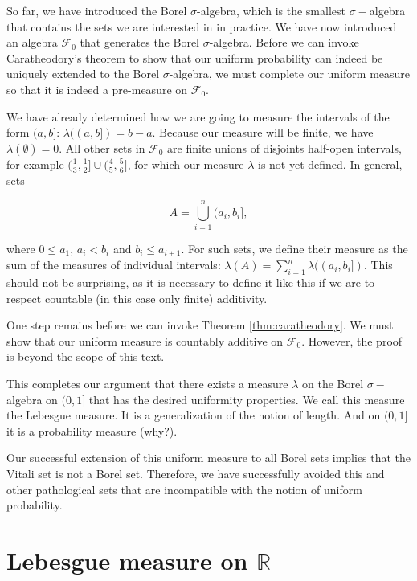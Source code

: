 \documentclass{book}
\theoremstyle{plain}%
\theoremstyle{definition}
\begin{document}
So far, we have introduced the Borel $\sigma$-algebra, which is the smallest $\sigma-$algebra that contains the sets we are interested in in practice. We have now introduced an algebra $\mathcal{F}_0$ that generates the Borel $\sigma$-algebra. Before we can invoke Caratheodory's theorem to show that our uniform probability can indeed be uniquely extended to the Borel $\sigma$-algebra, we must complete our uniform measure so that it is indeed a pre-measure on $\mathcal{F}_0$.

We have already determined how we are going to measure the intervals of the form $(a, b]$: $\lambda((a, b]) = b - a$. Because our measure will be finite, we have $\lambda(\emptyset) = 0$. All other sets in $\mathcal{F}_0$ are finite unions of disjoints half-open intervals, for example $(\frac{1}{3}, \frac{1}{2}] \cup (\frac{4}{5}, \frac{5}{6}]$, for which our measure $\lambda$ is not yet defined. In general, sets

$$A = \bigcup_{i=1}^n (a_i, b_i],$$

where $0 \leq a_1$, $a_i < b_i$ and $b_i \leq a_{i+1}$. For such sets, we define their measure as the sum of the measures of individual intervals: $\lambda(A) = \sum_{i=1}^n \lambda((a_i, b_i])$. This should not be surprising, as it is necessary to define it like this if we are to respect countable (in this case only finite) additivity.

One step remains before we can invoke Theorem \ref{thm:caratheodory}. We must show that our uniform measure is countably additive on $\mathcal{F}_0$. However, the proof is beyond the scope of this text.

This completes our argument that there exists a measure $\lambda$ on the Borel $\sigma-$algebra on $(0,1]$ that has the desired uniformity properties. We call this measure the Lebesgue measure. It is a generalization of the notion of length. And on $(0, 1]$ it is a probability measure (why?).

Our successful extension of this uniform measure to all Borel sets implies that the Vitali set is not a Borel set. Therefore, we have successfully avoided this and other pathological sets that are incompatible with the notion of uniform probability. %

\section{Lebesgue measure on $\mathbb{R}$}
\end{document}
